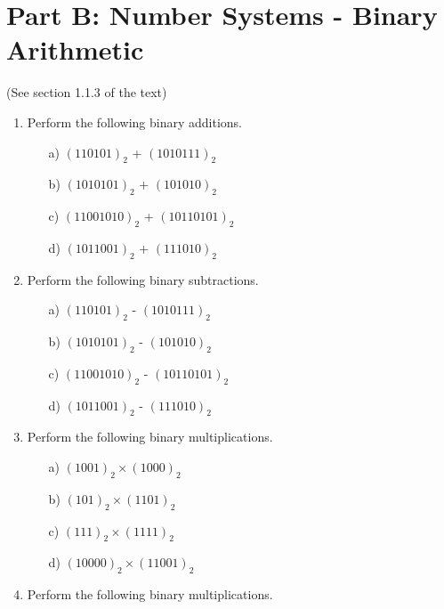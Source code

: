 \documentclass[]{report}
\begin{document}
\section*{Part B: Number Systems - Binary Arithmetic}
(See section 1.1.3 of the text)
\begin{enumerate}
\item Perform the following binary additions.
\begin{multicols}{2}
\begin{itemize}
\item[a)] $(110101)_{2}$ + $(1010111)_{2}$
\item[b)] $(1010101)_{2}$ + $(101010)_{2}$
\item[c)] $(11001010)_{2}$ + $(10110101)_{2}$
\item[d)] $(1011001)_{2}$ + $(111010)_{2}$
\end{itemize}
\end{multicols}

\item Perform the following binary subtractions.
\begin{multicols}{2}
\begin{itemize}
\item[a)] $(110101)_{2}$ - $(1010111)_{2}$
\item[b)] $(1010101)_{2}$ - $(101010)_{2}$
\item[c)] $(11001010)_{2}$ - $(10110101)_{2}$
\item[d)] $(1011001)_{2}$ - $(111010)_{2}$
\end{itemize}
\end{multicols}


\item Perform the following binary multiplications.
\begin{multicols}{2}
\begin{itemize}
\item[a)] $(1001)_{2}\times( 1000)_{2}$  %
\item[b)] $(101)_{2}\times(1101)_{2}$ %
\item[c)] $(111)_{2}\times(1111)_{2}$ %
\item[d)] $(10000)_{2}\times(11001)_{2}$    %
\end{itemize}
\end{multicols}

\newpage

\item Perform the following binary multiplications.


\end{enumerate}
\end{document}
